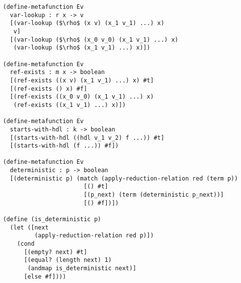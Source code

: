 \documentclass[12pt,a4paper,twoside,openright]{report}
\begin{document}
\begin{lstlisting}[xleftmargin=0cm, xrightmargin=0cm]
(define-metafunction Ev
  var-lookup : r x -> v
  [(var-lookup ($\rho$ (x v) (x_1 v_1) ...) x)
   v]
  [(var-lookup ($\rho$ (x_0 v_0) (x_1 v_1) ...) x)
   (var-lookup ($\rho$ (x_1 v_1) ...) x)])

(define-metafunction Ev
  ref-exists : m x -> boolean
  [(ref-exists ((x v) (x_1 v_1) ...) x) #t]
  [(ref-exists () x) #f]
  [(ref-exists ((x_0 v_0) (x_1 v_1) ...) x)
   (ref-exists ((x_1 v_1) ...) x)])

(define-metafunction Ev
  starts-with-hdl : k -> boolean
  [(starts-with-hdl ((hdl v_1 v_2) f ...)) #t]
  [(starts-with-hdl (f ...)) #f])

(define-metafunction Ev
  deterministic : p -> boolean
  [(deterministic p) (match (apply-reduction-relation red (term p))
                       [() #t]
                       [(p_next) (term (deterministic p_next))]
                       [() #f])])

(define (is_deterministic p)
  (let ([next
         (apply-reduction-relation red p)])
    (cond
      [(empty? next) #t]
      [(equal? (length next) 1)
       (andmap is_deterministic next)]
      [else #f])))
\end{lstlisting}


\end{document}
